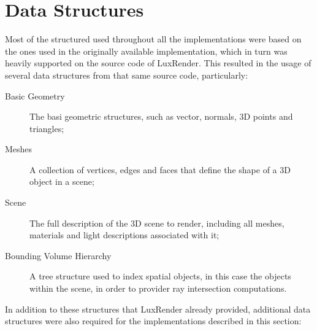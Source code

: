 \documentclass[main.tex]{subfiles}
\begin{document}
\section{Data Structures} \label{section:data_structures}

Most of the structured used throughout all the implementations were based on the ones used in the originally available implementation, which in turn was heavily supported on the source code of LuxRender. This resulted in the usage of several data structures from that same source code, particularly:

\begin{description}
\item[Basic Geometry] The basi geometric structures, such as vector, normals, 3D points and triangles;

\item[Meshes] A collection of vertices, edges and faces that define the shape of a 3D object in a scene;

\item[Scene] The full description of the 3D scene to render, including all meshes, materials and light descriptions associated with it;

\item[Bounding Volume Hierarchy] A tree structure used to index spatial objects, in this case the objects within the scene, in order to provider ray intersection computations.

\end{description}

In addition to these structures that LuxRender already provided, additional data structures were also required for the implementations described in this section:
\end{document}
